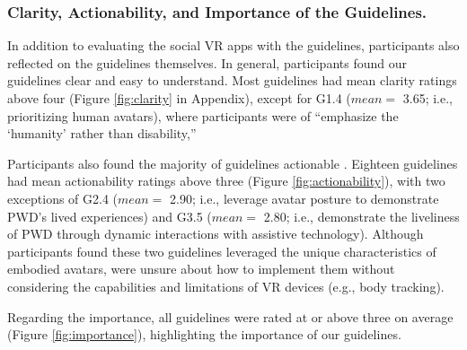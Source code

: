 \subsubsection{Clarity, Actionability, and Importance of the Guidelines.} %
In addition to evaluating the social VR apps with the guidelines, participants also reflected on the guidelines themselves. In general, participants found our guidelines clear and easy to understand. Most guidelines had mean clarity ratings above four (Figure \ref{fig:clarity} in Appendix), %
except for G1.4 ($mean =$ 3.65; i.e., prioritizing human avatars), where  participants  %
were  of ``emphasize the `humanity' rather than disability,''  %

 Participants also found the majority of guidelines actionable . %
 Eighteen guidelines had mean actionability ratings above three (Figure \ref{fig:actionability}), with two exceptions of G2.4 ($mean =$ 2.90; i.e., leverage avatar posture to demonstrate PWD's lived experiences) and G3.5 ($mean =$ 2.80; i.e., demonstrate the liveliness of PWD through dynamic interactions with assistive technology). Although participants found these two guidelines leveraged the unique characteristics of embodied avatars,  %
were unsure about how to implement them without considering the capabilities and limitations of VR devices (e.g., body tracking).  %

Regarding the importance, all guidelines were rated at or above three on average (Figure \ref{fig:importance}), highlighting the importance of our guidelines. 

